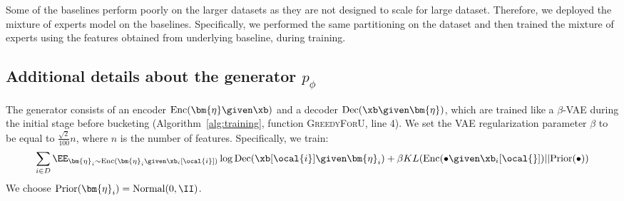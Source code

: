 \documentclass[letterpaper]{article}
\begin{document}
Some of the baselines perform poorly on the larger datasets as they are not designed to scale for large dataset. Therefore, we deployed the mixture of experts model on the baselines. Specifically, we performed the same  partitioning on the dataset and then trained the mixture of experts using the features obtained from underlying baseline, during training.  



\subsection{Additional details about the generator $p_{\phi}$}
 The generator consists of an encoder $\text{Enc}(\bm{\eta}  \given \xb)$ and a decoder $\text{Dec}(\xb \given \bm{\eta})$, which are trained like a $\beta$-VAE during the initial stage before bucketing (Algorithm~\ref{alg:training}, function \textsc{GreedyForU}, line 4). We set the VAE regularization parameter $\beta$ to be equal to $\frac{\sqrt{2}}{100}n$, where $n$ is the number of features. Specifically, we train:
\begin{align}
\sum_{i\in D}\EE_{\bm{\eta}_i\sim\text{Enc}(\bm{\eta}_i \given \xb_i[\ocal{i}])} \log \text{Dec} (\xb[\ocal{i}]\given \bm{\eta}_i) +  \beta KL(\text{Enc}(\bullet\given\xb_i[\ocal{}]) || \text{Prior}(\bullet))
\end{align}
We choose $\text{Prior}(\bm{\eta}_i) = \text{Normal} (0,\II)$.
\end{document}
